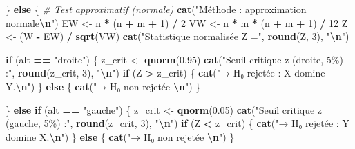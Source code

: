 \documentclass[
  12pt,
]{article}
\newenvironment{Shaded}{\begin{snugshade}}{\end{snugshade}}
\newcommand{\CommentTok}[1]{\textcolor[rgb]{0.56,0.35,0.01}{\textit{#1}}}
\newcommand{\ControlFlowTok}[1]{\textcolor[rgb]{0.13,0.29,0.53}{\textbf{#1}}}
\newcommand{\DecValTok}[1]{\textcolor[rgb]{0.00,0.00,0.81}{#1}}
\newcommand{\FloatTok}[1]{\textcolor[rgb]{0.00,0.00,0.81}{#1}}
\newcommand{\FunctionTok}[1]{\textcolor[rgb]{0.13,0.29,0.53}{\textbf{#1}}}
\newcommand{\NormalTok}[1]{#1}
\newcommand{\OtherTok}[1]{\textcolor[rgb]{0.56,0.35,0.01}{#1}}
\newcommand{\SpecialCharTok}[1]{\textcolor[rgb]{0.81,0.36,0.00}{\textbf{#1}}}
\newcommand{\StringTok}[1]{\textcolor[rgb]{0.31,0.60,0.02}{#1}}
\begin{document}
\begin{Shaded}
\begin{Highlighting}[]
\NormalTok{  \} }\ControlFlowTok{else}\NormalTok{ \{}
    \CommentTok{\# Test approximatif (normale)}
    \FunctionTok{cat}\NormalTok{(}\StringTok{"Méthode : approximation normale}\SpecialCharTok{\textbackslash{}n}\StringTok{"}\NormalTok{)}
\NormalTok{    EW }\OtherTok{\textless{}{-}}\NormalTok{ n }\SpecialCharTok{*}\NormalTok{ (n }\SpecialCharTok{+}\NormalTok{ m }\SpecialCharTok{+} \DecValTok{1}\NormalTok{) }\SpecialCharTok{/} \DecValTok{2}
\NormalTok{    VW }\OtherTok{\textless{}{-}}\NormalTok{ n }\SpecialCharTok{*}\NormalTok{ m }\SpecialCharTok{*}\NormalTok{ (n }\SpecialCharTok{+}\NormalTok{ m }\SpecialCharTok{+} \DecValTok{1}\NormalTok{) }\SpecialCharTok{/} \DecValTok{12}
\NormalTok{    Z }\OtherTok{\textless{}{-}}\NormalTok{ (W }\SpecialCharTok{{-}}\NormalTok{ EW) }\SpecialCharTok{/} \FunctionTok{sqrt}\NormalTok{(VW)}
    \FunctionTok{cat}\NormalTok{(}\StringTok{"Statistique normalisée Z ="}\NormalTok{, }\FunctionTok{round}\NormalTok{(Z, }\DecValTok{3}\NormalTok{), }\StringTok{"}\SpecialCharTok{\textbackslash{}n}\StringTok{"}\NormalTok{)}
    
    \ControlFlowTok{if}\NormalTok{ (alt }\SpecialCharTok{==} \StringTok{"droite"}\NormalTok{) \{}
\NormalTok{      z\_crit }\OtherTok{\textless{}{-}} \FunctionTok{qnorm}\NormalTok{(}\FloatTok{0.95}\NormalTok{)}
      \FunctionTok{cat}\NormalTok{(}\StringTok{"Seuil critique z (droite, 5\%) :"}\NormalTok{, }\FunctionTok{round}\NormalTok{(z\_crit, }\DecValTok{3}\NormalTok{), }\StringTok{"}\SpecialCharTok{\textbackslash{}n}\StringTok{"}\NormalTok{)}
      \ControlFlowTok{if}\NormalTok{ (Z }\SpecialCharTok{\textgreater{}}\NormalTok{ z\_crit) \{}
        \FunctionTok{cat}\NormalTok{(}\StringTok{"→ H₀ rejetée : X domine Y.}\SpecialCharTok{\textbackslash{}n}\StringTok{"}\NormalTok{)}
\NormalTok{      \} }\ControlFlowTok{else}\NormalTok{ \{}
        \FunctionTok{cat}\NormalTok{(}\StringTok{"→ H₀ non rejetée }\SpecialCharTok{\textbackslash{}n}\StringTok{"}\NormalTok{)}
\NormalTok{      \}}
      
\NormalTok{    \} }\ControlFlowTok{else} \ControlFlowTok{if}\NormalTok{ (alt }\SpecialCharTok{==} \StringTok{"gauche"}\NormalTok{) \{}
\NormalTok{      z\_crit }\OtherTok{\textless{}{-}} \FunctionTok{qnorm}\NormalTok{(}\FloatTok{0.05}\NormalTok{)}
      \FunctionTok{cat}\NormalTok{(}\StringTok{"Seuil critique z (gauche, 5\%) :"}\NormalTok{, }\FunctionTok{round}\NormalTok{(z\_crit, }\DecValTok{3}\NormalTok{), }\StringTok{"}\SpecialCharTok{\textbackslash{}n}\StringTok{"}\NormalTok{)}
      \ControlFlowTok{if}\NormalTok{ (Z }\SpecialCharTok{\textless{}}\NormalTok{ z\_crit) \{}
        \FunctionTok{cat}\NormalTok{(}\StringTok{"→ H₀ rejetée : Y domine X.}\SpecialCharTok{\textbackslash{}n}\StringTok{"}\NormalTok{)}
\NormalTok{      \} }\ControlFlowTok{else}\NormalTok{ \{}
        \FunctionTok{cat}\NormalTok{(}\StringTok{"→ H₀ non rejetée }\SpecialCharTok{\textbackslash{}n}\StringTok{"}\NormalTok{)}
\NormalTok{      \}}
      

\end{Highlighting}
\end{Shaded}
\end{document}
